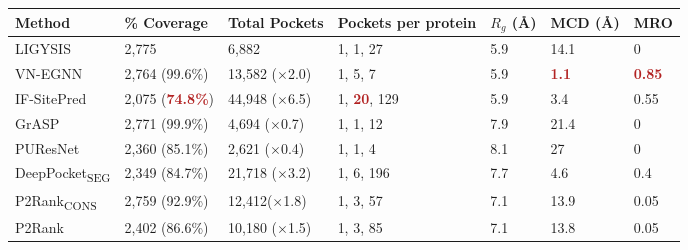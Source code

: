\begin{landscape}
\begin{longtable}[c]{|M{28mm}|M{29mm}|M{29mm}|M{37mm}|M{28mm}|M{28mm}|M{20mm}|}
\hline
\textbf{Method}        & \textbf{\% Coverage}    & \textbf{Total Pockets}  & \textbf{Pockets per protein} & \textbf{$R_{g}$ (\AA{})} & \textbf{MCD (\AA{})} & \textbf{MRO}  \\ \hline
\endfirsthead
%
\endhead
%
LIGYSIS       & 2,775          & 6,882          & 1, 1, 27            & 5.9                              & 14.1                         & 0    \\ \hline
VN-EGNN       & 2,764 (99.6\%)   & 13,582 ($\times$2.0) & 1, 5, 7             & 5.9                              & \textbf{\textcolor{firebrick}{1.1}}                          & \textbf{\textcolor{firebrick}{0.85}} \\ \hline
IF-SitePred   & 2,075 (\textbf{\textcolor{firebrick}{74.8\%}}) & 44,948 ($\times$6.5) & 1, \textbf{\textcolor{firebrick}{20}}, 129          & 5.9                              & 3.4                          & 0.55 \\ \hline
GrASP         & 2,771 (99.9\%) & 4,694 ($\times$0.7)  & 1, 1, 12            & 7.9                              & 21.4                         & 0    \\ \hline
PUResNet      & 2,360 (85.1\%) & 2,621 ($\times$0.4)  & 1, 1, 4             & 8.1                              & 27                           & 0    \\ \hline
DeepPocket\textsubscript{SEG} & 2,349 (84.7\%) & 21,718 ($\times$3.2) & 1, 6, 196           & 7.7                              & 4.6                          & 0.4  \\ \hline
P2Rank\textsubscript{CONS}    & 2,759 (92.9\%) & 12,412($\times$1.8)  & 1, 3, 57            & 7.1                              & 13.9                         & 0.05 \\ \hline
P2Rank        & 2,402 (86.6\%) & 10,180 ($\times$1.5) & 1, 3, 85            & 7.1                              & 13.8                         & 0.05 \\ \hline

\end{longtable}
\end{landscape}

